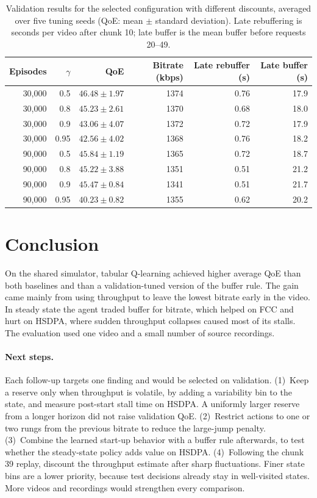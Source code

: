 \documentclass[10pt,letterpaper]{article}
\begin{document}
\begin{table}[htbp]
\centering
\small
\caption{Validation results for the selected configuration with different
discounts, averaged over five tuning seeds (QoE: mean \(\pm\) standard
deviation). Late rebuffering is seconds per video after chunk 10; late buffer
is the mean buffer before requests 20--49.}
\label{tab:discount}
\begin{tabular}{rrrrrr}
\toprule
Episodes & \(\gamma\) & QoE & Bitrate (kbps) & Late rebuffer (s) & Late buffer (s) \\
\midrule
30,000 & 0.5 & \(46.48\pm1.97\) & 1374 & 0.76 & 17.9 \\
30,000 & 0.8 & \(45.23\pm2.61\) & 1370 & 0.68 & 18.0 \\
30,000 & 0.9 & \(43.06\pm4.07\) & 1372 & 0.72 & 17.9 \\
30,000 & 0.95 & \(42.56\pm4.02\) & 1368 & 0.76 & 18.2 \\
\midrule
90,000 & 0.5 & \(45.84\pm1.19\) & 1365 & 0.72 & 18.7 \\
90,000 & 0.8 & \(45.22\pm3.88\) & 1351 & 0.51 & 21.2 \\
90,000 & 0.9 & \(45.47\pm0.84\) & 1341 & 0.51 & 21.7 \\
90,000 & 0.95 & \(40.23\pm0.82\) & 1355 & 0.62 & 20.2 \\
\bottomrule
\end{tabular}
\end{table}

\section{Conclusion}

On the shared simulator, tabular Q-learning achieved higher average QoE than
both baselines and than a validation-tuned version of the buffer rule. The gain
came mainly from using throughput to leave the lowest bitrate early in the
video. In steady state the agent traded buffer for bitrate, which helped on
FCC and hurt on HSDPA, where sudden throughput collapses caused most of its
stalls. The evaluation used one video and a small number of source recordings.

\paragraph{Next steps.} Each follow-up targets one finding and would be
selected on validation.
(1)~Keep a reserve only when throughput is volatile, by adding a variability
bin to the state, and measure post-start stall time on HSDPA. A uniformly
larger reserve from a longer horizon did not raise validation QoE.
(2)~Restrict actions to one or two rungs from the previous bitrate to reduce
the large-jump penalty.
(3)~Combine the learned start-up behavior with a buffer rule afterwards, to
test whether the steady-state policy adds value on HSDPA.
(4)~Following the chunk 39 replay, discount the throughput estimate after sharp
fluctuations.
Finer state bins are a lower priority, because test decisions already stay in
well-visited states. More videos and recordings would strengthen every
comparison.
\end{document}
